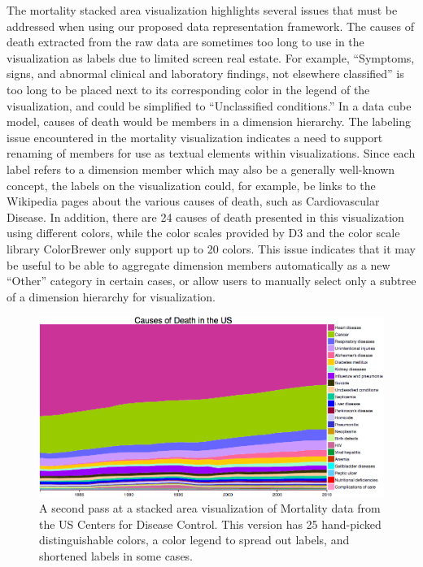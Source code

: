 The mortality stacked area visualization highlights several issues that must be addressed when using our proposed data representation framework. The causes of death extracted from the raw data are sometimes too long to use in the visualization as labels due to limited screen real estate. For example, ``Symptoms, signs, and abnormal clinical and laboratory findings, not elsewhere classified'' is too long to be placed next to its corresponding color in the legend of the visualization, and could be simplified to ``Unclassified conditions.'' In a data cube model, causes of death would be members in a dimension hierarchy. The labeling issue encountered in the mortality visualization indicates a need to support renaming of members for use as textual elements within visualizations. Since each label refers to a dimension member which may also be a generally well-known concept, the labels on the visualization could, for example, be links to the Wikipedia pages about the various causes of death, such as Cardiovascular Disease. In addition, there are 24 causes of death presented in this visualization using different colors, while the color scales provided by D3 and the color scale library ColorBrewer only support up to 20 colors. This issue indicates that it may be useful to be able to aggregate dimension members automatically as a new ``Other'' category in certain cases, or allow users to manually select only a subtree of a dimension hierarchy for visualization.

\begin{figure}[h!]
  \centering
  \includegraphics[width=\figureWidth]{figs/mortalityVisV2.png}
  \caption[CDC Mortality Visualization Version 2.]
   {A second pass at a stacked area visualization of Mortality data from the US Centers for Disease Control. This version has 25 hand-picked distinguishable colors, a color legend to spread out labels, and shortened labels in some cases.}
  \label{fig:mortalityVisV2}
\end{figure}

